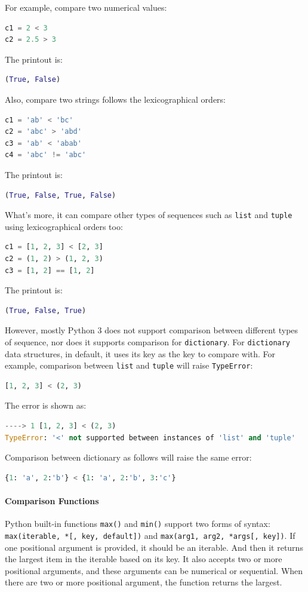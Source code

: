 \documentclass[../main.tex]{subfiles}
\begin{document}
For example, compare two numerical values:
\begin{lstlisting}[language=Python]
c1 = 2 < 3
c2 = 2.5 > 3
\end{lstlisting}
The printout is:
\begin{lstlisting}[language=Python]
(True, False)
\end{lstlisting}
Also, compare two strings follows the lexicographical orders:
\begin{lstlisting}[language=Python]
c1 = 'ab' < 'bc'
c2 = 'abc' > 'abd'
c3 = 'ab' < 'abab'
c4 = 'abc' != 'abc'
\end{lstlisting}
The printout is:
\begin{lstlisting}[language=Python]
(True, False, True, False)
\end{lstlisting}
What's more, it can compare other types of sequences such as \texttt{list} and \texttt{tuple} using lexicographical orders too:
\begin{lstlisting}[language=Python]
c1 = [1, 2, 3] < [2, 3]
c2 = (1, 2) > (1, 2, 3)
c3 = [1, 2] == [1, 2]
\end{lstlisting}
The printout is:
\begin{lstlisting}[language=Python]
(True, False, True)
\end{lstlisting}
However, mostly Python 3 does not support comparison between different types of sequence, nor does it supports comparison for \texttt{dictionary}.  For \texttt{dictionary} data structures, in default, it uses its key as the key to compare with. For example, comparison between \texttt{list} and \texttt{tuple} will raise \texttt{TypeError}:
\begin{lstlisting}[language=Python]
[1, 2, 3] < (2, 3)
\end{lstlisting}
The error is shown as:
\begin{lstlisting}[language=Python]
----> 1 [1, 2, 3] < (2, 3)
TypeError: '<' not supported between instances of 'list' and 'tuple'
\end{lstlisting}
Comparison between dictionary as follows will raise the same error:
\begin{lstlisting}[language=Python]
{1: 'a', 2:'b'} < {1: 'a', 2:'b', 3:'c'}
\end{lstlisting}
\paragraph{Comparison Functions} 
Python built-in functions \texttt{max()} and \texttt{min()} support two forms of syntax: \texttt{max(iterable, *[, key, default])} and \texttt{max(arg1, arg2, *args[, key])}. If one positional argument is provided, it should be an iterable. And then it returns the largest item in the iterable based on its key. It also accepts two or more positional arguments, and these arguments can be numerical or sequential. When there are two or more positional argument, the function returns the largest. 
\end{document}
